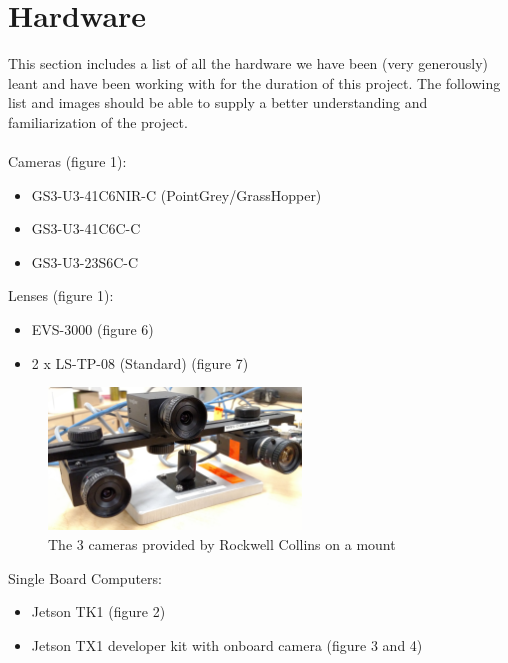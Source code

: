 \documentclass[letterpaper,10pt,titlepage]{IEEEtran}
\begin{document}
\section{Hardware}
   This section includes a list of all the hardware we have been (very generously) leant and have been working with for the duration of this project. The following list and images should be able to supply a better understanding and familiarization of the project.\\
	\\Cameras (figure 1):  
    		\begin{itemize}
		\item GS3-U3-41C6NIR-C (PointGrey/GrassHopper)
		\item GS3-U3-41C6C-C
		\item GS3-U3-23S6C-C\\
		\end{itemize}
	Lenses (figure 1): 
		\begin{itemize}
		\item EVS-3000 (figure 6)
		\item 2 x LS-TP-08 (Standard) (figure 7)\\
		\end{itemize}
		
\begin{figure}[!ht]
  \caption{The 3 cameras provided by Rockwell Collins on a mount}
	  \centering
		    \includegraphics[width=0.6\textwidth,natwidth=610,natheight=642]{images/IMG_20160210_131527329.jpg}
				\end{figure}
				
	Single Board Computers: 
		\begin{itemize}
		\item Jetson TK1 (figure 2) 
		\item Jetson TX1 developer kit with onboard camera (figure 3 and 4)\\
		\end{itemize}
 
\end{document}
